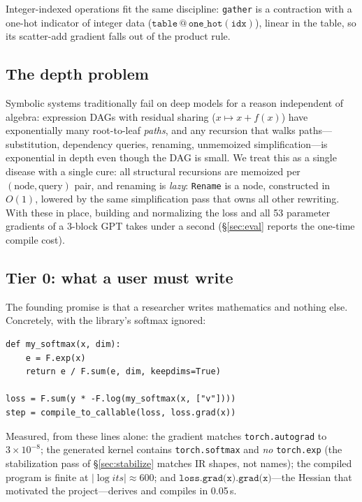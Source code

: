 \documentclass[sigplan,10pt,review]{acmart}
\begin{document}
Integer-indexed operations fit the same discipline: \texttt{gather} is
a contraction with a one-hot indicator of integer data
($\texttt{table} \mathbin{@} \texttt{one\_hot}(\texttt{idx})$), linear in
the table, so its scatter-add gradient falls out of the product rule.

\subsection{The depth problem}\label{sec:depth}

Symbolic systems traditionally fail on deep models for a reason
independent of algebra: expression DAGs with residual sharing
($x \mapsto x + f(x)$) have exponentially many root-to-leaf \emph{paths},
and any recursion that walks paths---substitution, dependency queries,
renaming, unmemoized simplification---is exponential in depth even though
the DAG is small. We treat this as a single disease with a single cure:
all structural recursions are memoized per $(\text{node},
\text{query})$ pair, and renaming is \emph{lazy}: \texttt{Rename} is a
node, constructed in $O(1)$, lowered by the same simplification pass that
owns all other rewriting. With these in place, building and normalizing
the loss and all 53 parameter gradients of a 3-block GPT takes under a
second (\S\ref{sec:eval} reports the one-time compile cost).

\subsection{Tier 0: what a user must write}\label{sec:tier0}

The founding promise is that a researcher writes mathematics and nothing
else. Concretely, with the library's softmax ignored:

\begin{lstlisting}
def my_softmax(x, dim):
    e = F.exp(x)
    return e / F.sum(e, dim, keepdims=True)

loss = F.sum(y * -F.log(my_softmax(x, ["v"])))
step = compile_to_callable(loss, loss.grad(x))
\end{lstlisting}

Measured, from these lines alone: the gradient matches
\texttt{torch.autograd} to $3\times10^{-8}$; the generated kernel
contains \texttt{torch.softmax} and \emph{no} \texttt{torch.exp}
(the stabilization pass of \S\ref{sec:stabilize} matches IR shapes, not
names); the compiled program is finite at $|{\log its}|\approx 600$; and
$\texttt{loss.grad(x).grad(x)}$---the Hessian that motivated the
project---derives and compiles in 0.05\,s.
\end{document}
